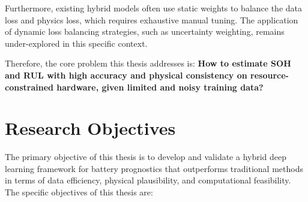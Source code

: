Furthermore, existing hybrid models often use static weights to balance the data loss and physics loss, which requires exhaustive manual tuning. The application of dynamic loss balancing strategies, such as uncertainty weighting, remains under-explored in this specific context.

Therefore, the core problem this thesis addresses is: \textbf{How to estimate SOH and RUL with high accuracy and physical consistency on resource-constrained hardware, given limited and noisy training data?}

\section{Research Objectives}

The primary objective of this thesis is to develop and validate a hybrid deep learning framework for battery prognostics that outperforms traditional methods in terms of data efficiency, physical plausibility, and computational feasibility. The specific objectives of this thesis are:

